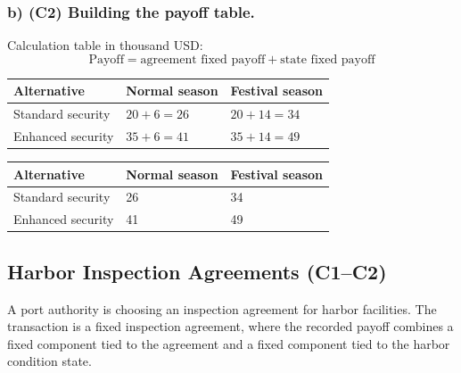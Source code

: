 	
	\subsubsection*{b) \textbf{(C2)} Building the payoff table.}
	\label{subsec:problem17-warehouse-security-agreements-c2}
	Calculation table in thousand USD:
	\[
	\text{Payoff}=\text{agreement fixed payoff}+\text{state fixed payoff}
	\]
	\begin{center}
		\begin{tabular}{lll}
			\toprule
			Alternative & Normal season & Festival season \\
			\midrule
			Standard security & $20 + 6 = 26$ & $20 + 14 = 34$ \\
			Enhanced security & $35 + 6 = 41$ & $35 + 14 = 49$ \\
			\bottomrule
		\end{tabular}
	\end{center}
	
	\begin{center}
		\begin{tabular}{lll}
			\toprule
			Alternative & Normal season & Festival season \\
			\midrule
			Standard security & 26 & 34 \\
			Enhanced security & 41 & 49 \\
			\bottomrule
		\end{tabular}
	\end{center}
	
	
	\subsection{Harbor Inspection Agreements (C1--C2)}
	\label{sec:problem10-harbor-inspection-agreements-c1-c2}
	A port authority is choosing an inspection agreement for harbor facilities. The transaction is a fixed inspection agreement, where the recorded payoff combines a fixed component tied to the agreement and a fixed component tied to the harbor condition state.
	
